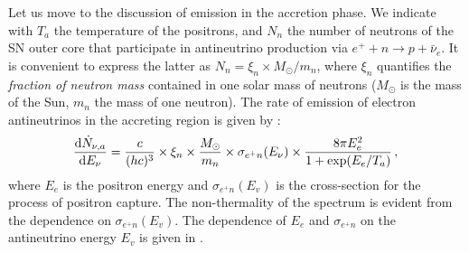 \documentclass[a4paper,11pt]{article}
\begin{document}
 


Let us move to the discussion of emission in the accretion phase. We indicate with  \(T_a\) the temperature of the positrons,
and  $N_n$ the number of neutrons
of the SN outer core %
that participate in antineutrino production via  $e^++n\to p+\bar{\nu}_e$. It is convenient to  express  the latter as $N_n=\xi_n \times M_\odot/m_n$, where $\xi_n$ quantifies the {\em fraction of neutron mass} contained in one solar mass of neutrons ($M_\odot$ is the mass of the Sun, \(m_n\)  the mass of one neutron).  The rate of emission of electron antineutrinos in the accreting region is given by \cite{sym13101851}:
\begin{dmath}
\label{eq:spectrum_accretion}
\dv{\dot{N}_{\nu,a}}{E_{\nu}}(E_{\nu}, t) = \frac{c}{(hc)^3} \times \xi_n \times \frac{M_{\odot}}{m_n}\times\sigma_{e^+ n}(E_{\nu}) \times \frac{ 8 \pi E_e^2}{1 + \exp(E_e/T_a)} \,,
\end{dmath}
where $E_e$ is the positron energy and $\sigma_{e^+ n}(E_v)$ is the cross-section for the process of positron capture. The non-thermality of the spectrum is evident from the dependence on  $\sigma_{e^+ n}(E_v)$. 
The dependence of $E_e$ and  $ \sigma_{e^+ n}$ on the antineutrino energy $E_v$ is given in \cite{Pagliaroli:2008ur}. %
 


\end{document}
